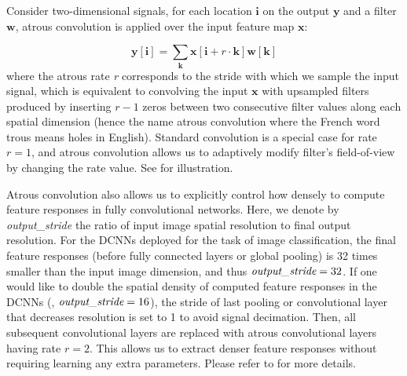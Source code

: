 Consider two-dimensional signals, for each location $\bm{i}$ on the output $\bm{y}$ and a filter $\bm{w}$, atrous convolution is applied over the input feature map $\bm{x}$:

\begin{equation}
  \bm{y}[\bm{i}] = \sum_{\bm{k}} \bm{x}[\bm{i} + r \cdot \bm{k}] \bm{w}[\bm{k}]
\end{equation}
where
the atrous rate \emph{r} corresponds to the stride with which we sample the input signal, which is equivalent to convolving the input $\bm{x}$ with upsampled filters produced by inserting $r - 1$ zeros between two consecutive filter values along each spatial dimension (hence the name atrous convolution where the French word trous means holes in English). Standard convolution is a special case for rate $r = 1$, and atrous convolution allows us to adaptively modify filter's field-of-view by changing the rate value. See  for illustration.

Atrous convolution also allows us to explicitly control how densely to compute feature responses in fully convolutional networks. Here, we denote by \emph{output\_stride} the ratio of input image spatial resolution to final output resolution. For the DCNNs \cite{krizhevsky2012imagenet, simonyan2014very, he2015deep} deployed for the task of image classification, the final feature responses (before fully connected layers or global pooling) is 32 times smaller than the input image dimension, and thus $\emph{output\_stride}=32$. If one would like to double the spatial density of computed feature responses in the DCNNs (\ie, $\emph{output\_stride} = 16$), the stride of last pooling or convolutional layer that decreases resolution is set to 1 to avoid signal decimation. Then, all subsequent convolutional layers are replaced with atrous convolutional layers having rate $r = 2$. This allows us to extract denser feature responses without requiring learning any extra parameters. Please refer to \cite{chen2016deeplab} for more details.

